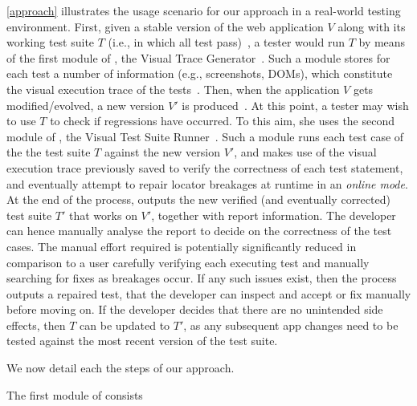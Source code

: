 \autoref{approach} illustrates the usage scenario for our approach in a real-world testing environment. 
First, given a stable version of the web application $V$ along with its working test suite $T$ (i.e., in which all test pass)~, a tester would run $T$ by means of the first module of \tool, the Visual Trace Generator~. Such a module stores for each test a number of information (e.g., screenshots, DOMs), which constitute the visual execution trace of the tests~. 
Then, when the application $V$ gets modified/evolved, a new version $V'$ is produced~. At this point, a tester may wish to use $T$ to check if regressions have occurred. To this aim, she uses the second module of \tool, the Visual Test Suite Runner~. Such a module runs each test case of the the test suite $T$ against the new version $V'$, and makes use of the visual execution trace previously saved to verify the correctness of each test statement, and eventually attempt to repair locator breakages at runtime in an \textit{online mode}. At the end of the process, \tool outputs the new verified (and eventually corrected) test suite $T'$ that works on $V'$, together with report information. 
The developer can hence manually analyse the report to decide on the correctness of the test cases. The manual effort required is potentially significantly reduced in comparison to a user carefully verifying each executing test and manually searching for fixes as breakages occur. If any such issues exist, then the process outputs a repaired test, that the developer can inspect and accept or fix  manually before moving on. If the developer decides that there are no unintended side effects, then $T$ can
be updated to $T'$, as any subsequent app changes need to be tested against the most recent version of the test suite.

We now detail each the steps of our approach.


The first module of \tool consists 




